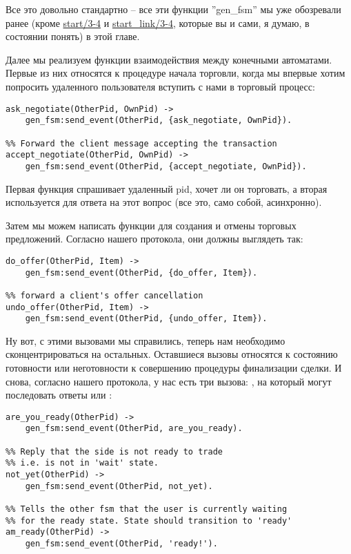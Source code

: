 Все это довольно стандартно \--- все эти функции ''gen\_fsm'' мы уже обозревали ранее (кроме \href{http://erldocs.com/18.0/stdlib/gen_fsm.html#start/3}{start/3-4} и \href{http://erldocs.com/18.0/stdlib/gen_fsm.html#start_link/3}{start\_link/3-4}, которые вы и сами, я думаю, в состоянии понять) в этой главе.

Далее мы реализуем функции взаимодействия между конечными автоматами.
Первые из них относятся к процедуре начала торговли, когда мы впервые хотим попросить удаленного пользователя вступить с нами в торговый процесс:
\begin{lstlisting}[style=erlang]
%% Ask the other FSM's Pid for a trade session
ask_negotiate(OtherPid, OwnPid) ->
	gen_fsm:send_event(OtherPid, {ask_negotiate, OwnPid}).
 
%% Forward the client message accepting the transaction
accept_negotiate(OtherPid, OwnPid) ->
	gen_fsm:send_event(OtherPid, {accept_negotiate, OwnPid}).
\end{lstlisting}

Первая функция спрашивает удаленный pid, хочет ли он торговать, а вторая используется для ответа на этот вопрос (все это, само собой, асинхронно).

Затем мы можем написать функции для создания и отмены торговых предложений.
Согласно нашего протокола, они должны выглядеть так:
\begin{lstlisting}[style=erlang]
%% forward a client's offer
do_offer(OtherPid, Item) ->
	gen_fsm:send_event(OtherPid, {do_offer, Item}).
 
%% forward a client's offer cancellation
undo_offer(OtherPid, Item) ->
	gen_fsm:send_event(OtherPid, {undo_offer, Item}).
\end{lstlisting}

Ну вот, с этими вызовами мы справились, теперь нам необходимо сконцентрироваться на остальных.
Оставшиеся вызовы относятся к состоянию готовности или неготовности к совершению процедуры финализации сделки.
И снова, согласно нашего протокола, у нас есть три вызова: , на который могут последовать ответы   или :

\begin{lstlisting}[style=erlang]
%% Ask the other side if he's ready to trade.
are_you_ready(OtherPid) ->
	gen_fsm:send_event(OtherPid, are_you_ready).
 
%% Reply that the side is not ready to trade
%% i.e. is not in 'wait' state.
not_yet(OtherPid) ->
	gen_fsm:send_event(OtherPid, not_yet).
 
%% Tells the other fsm that the user is currently waiting
%% for the ready state. State should transition to 'ready'
am_ready(OtherPid) ->
	gen_fsm:send_event(OtherPid, 'ready!').
\end{lstlisting}

